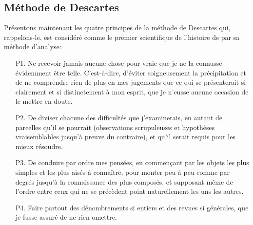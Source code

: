 	\subsection{M\'ethode de Descartes}
	Pr\'esentons maintenant les quatre principes de la m\'ethode de Descartes qui, rappelons-le, est consid\'er\'e comme le premier scientifique de l'histoire de par sa m\'ethode d'analyse:
	\begin{itemize}
		\item[P1.] Ne recevoir jamais aucune chose pour vraie que je ne la connusse \'evidemment être telle. C'est-à-dire, d'\'eviter soigneusement la pr\'ecipitation et de ne comprendre rien de plus en mes jugements que ce qui se pr\'esenterait si clairement et si distinctement à mon esprit, que je n'eusse aucune occasion de le mettre en doute.
		
		\item[P2.] De diviser chacune des difficult\'es que j'examinerais, en autant de parcelles qu'il se pourrait (observations scrupuleuses et hypothèses vraisemblables jusqu'à preuve du contraire), et qu'il serait requis pour les mieux r\'esoudre.
		
		\item[P3.] De conduire par ordre mes pens\'ees, en commençant par les objets les plus simples et les plus ais\'es à connaître, pour monter peu à peu comme par degr\'es jusqu'à la connaissance des plus compos\'es, et supposant même de l'ordre entre ceux qui ne se pr\'ecèdent point naturellement les uns les autres.
		
		\item[P4.] Faire partout des d\'enombrements si entiers et des revues si g\'en\'erales, que je fusse assur\'e de ne rien omettre.
	\end{itemize}	
	
